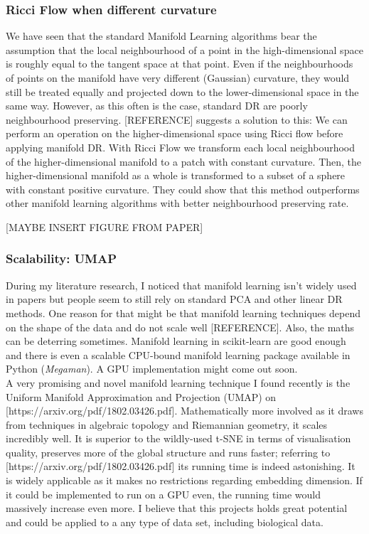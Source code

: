 \documentclass[journal, a4paper]{IEEEtran}
\begin{document}
\subsubsection{Ricci Flow when different curvature} 
We have seen that the standard Manifold Learning algorithms bear the assumption that the local neighbourhood of a point in the high-dimensional space is roughly equal to the tangent space at that point. Even if the neighbourhoods of points on the manifold have very different (Gaussian) curvature, they would still be treated equally and projected down to the lower-dimensional space in the same way. However, as this often is the case, standard DR are poorly neighbourhood preserving. [REFERENCE] suggests a solution to this: We can perform an operation on the higher-dimensional space using Ricci flow before applying manifold DR. With Ricci Flow we transform each local neighbourhood of the higher-dimensional manifold to a patch with constant curvature. Then, the higher-dimensional manifold as a whole is transformed to a subset of a sphere with constant positive curvature. They could show that this method outperforms other manifold learning algorithms with better neighbourhood preserving rate.%

[MAYBE INSERT FIGURE FROM PAPER]

\subsubsection{Scalability: UMAP}
During my literature research, I noticed that manifold learning isn’t widely used in papers but people seem to still rely on standard PCA and other linear DR methods. 
One reason for that might be that manifold learning techniques depend on the shape of the data and do not scale well [REFERENCE]. Also, the maths can be deterring sometimes. Manifold learning in scikit-learn are good enough and there is even a scalable CPU-bound manifold learning package available in Python (\textit{Megaman}). A GPU implementation might come out soon.\\
A very promising and novel manifold learning technique I found recently is the Uniform Manifold Approximation and Projection (UMAP) on [https://arxiv.org/pdf/1802.03426.pdf]. Mathematically more involved as it draws from techniques in algebraic topology and Riemannian geometry, it scales incredibly well. It is superior to the wildly-used t-SNE in terms of visualisation quality, preserves more of the global structure and runs faster; referring to [https://arxiv.org/pdf/1802.03426.pdf] its running time is indeed astonishing. It is widely applicable as it makes no restrictions regarding embedding dimension. If it could be implemented to run on a GPU even, the running time would massively increase even more. I believe that this projects holds great potential and could be applied to a any type of data set, including biological data.
\end{document}
